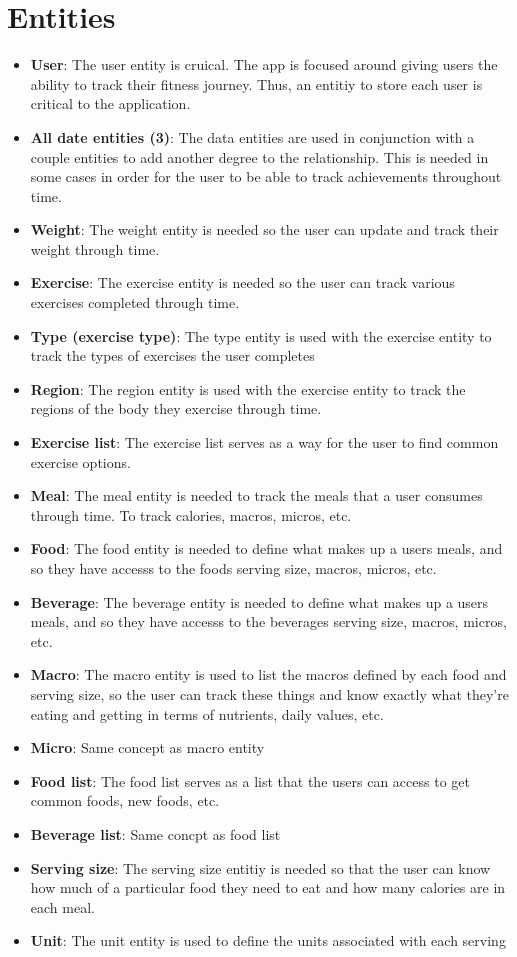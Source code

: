 \documentclass{report}
\begin{document}
    \section{Entities}
    \begin{itemize}
        \item \textbf{User}: The user entity is cruical. The app is focused around giving users the ability to track their fitness journey. Thus, an entitiy to store each user is critical to the application.
        \item \textbf{All date entities (3)}: The data entities are used in conjunction with a couple entities to add another degree to the relationship. This is needed in some cases in order for the user to be able to track achievements throughout time.
        \item \textbf{Weight}: The weight entity is needed so the user can update and track their weight through time.
        \item \textbf{Exercise}: The exercise entity is needed so the user can track various exercises completed through time.
        \item \textbf{Type (exercise type)}: The type entity is used with the exercise entity to track the types of exercises the user completes
        \item \textbf{Region}:  The region entity is used with the exercise entity to track the regions of the body they exercise through time.
        \item \textbf{Exercise list}: The exercise list serves as a way for the user to find common exercise options.
        \item \textbf{Meal}: The meal entity is needed to track the meals that a user consumes through time. To track calories, macros, micros, etc.
        \item \textbf{Food}: The food entity is needed to define what makes up a users meals, and so they have accesss to the foods serving size, macros, micros, etc.
        \item \textbf{Beverage}: The beverage entity is needed to define what makes up a users meals, and so they have accesss to the beverages serving size, macros, micros, etc.
        \item \textbf{Macro}: The macro entity is used to list the macros defined by each food and serving size, so the user can track these things and know exactly what they're eating and getting in terms of nutrients, daily values, etc.
        \item \textbf{Micro}: Same concept as macro entity
        \item \textbf{Food list}: The food list serves as a list that the users can access to get common foods, new foods, etc. 
        \item \textbf{Beverage list}: Same concpt as food list
        \item \textbf{Serving size}: The serving size entitiy is needed so that the user can know how much of a particular food they need to eat and how many calories are in each meal.
        \item \textbf{Unit}: The unit entity is used to define the units associated with each serving
    \end{itemize}
\end{document}
